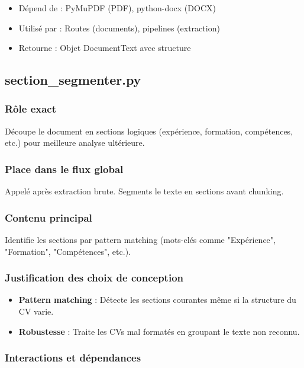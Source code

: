 \documentclass[12pt,a4paper,oneside]{book}
\begin{document}
\begin{itemize}
    \item Dépend de : PyMuPDF (PDF), python-docx (DOCX)
    \item Utilisé par : Routes (documents), pipelines (extraction)
    \item Retourne : Objet DocumentText avec structure
\end{itemize}

\subsection{section\_segmenter.py}

\subsubsection{Rôle exact}

Découpe le document en sections logiques (expérience, formation, compétences, etc.) pour meilleure analyse ultérieure.

\subsubsection{Place dans le flux global}

Appelé après extraction brute. Segments le texte en sections avant chunking.

\subsubsection{Contenu principal}

Identifie les sections par pattern matching (mots-clés comme "Expérience", "Formation", "Compétences", etc.).

\subsubsection{Justification des choix de conception}

\begin{itemize}
    \item \textbf{Pattern matching} : Détecte les sections courantes même si la structure du CV varie.
    
    \item \textbf{Robustesse} : Traite les CVs mal formatés en groupant le texte non reconnu.
\end{itemize}

\subsubsection{Interactions et dépendances}
\end{document}
